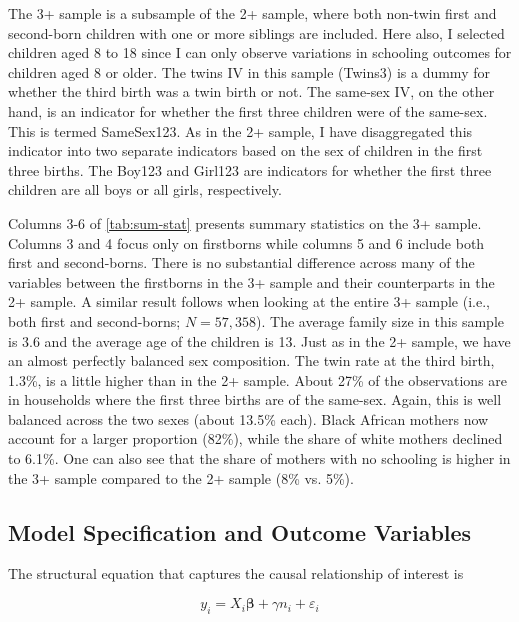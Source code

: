 The 3+ sample is a subsample of the 2+ sample, where both non-twin first and second-born children with one or more siblings are included. Here also, I selected children aged 8 to 18 since I can only observe variations in schooling outcomes for children aged 8 or older. The twins IV in this sample (Twins3) is a dummy for whether the third birth was a twin birth or not. The same-sex IV, on the other hand, is an indicator for whether the first three children were of the same-sex. This is termed SameSex123. As in the 2+ sample, I have disaggregated this indicator into two separate indicators based on the sex of children in the first three births. The Boy123 and Girl123 are indicators for whether the first three children are all boys or all girls, respectively. 

Columns 3-6 of \autoref{tab:sum-stat} presents summary statistics on the 3+ sample. Columns 3 and 4 focus only on firstborns while columns 5 and 6 include both first and second-borns. There is no substantial difference across many of the variables between the firstborns in the 3+ sample and their counterparts in the 2+ sample. A similar result follows when looking at the entire 3+ sample (i.e., both first and second-borns; $ N = 57,358 $). The average family size in this sample is 3.6 and the average age of the children is 13. Just as in the 2+ sample, we have an almost perfectly balanced sex composition. The twin rate at the third birth, 1.3\%, is a little higher than in the 2+ sample. About 27\% of the observations are in households where the first three births are of the same-sex. Again, this is well balanced across the two sexes (about 13.5\% each). Black African mothers now account for a larger proportion (82\%), while the share of white mothers declined to 6.1\%. One can also see that the share of mothers with no schooling is higher in the 3+ sample compared to the 2+ sample (8\% vs. 5\%).   
    

\subsection{Model Specification and Outcome Variables}
\label{section:outcomes}

The structural equation that captures the causal relationship of interest is

\begin{equation}\label{eq:01}
	y_{i} = X_{i}\boldsymbol{\beta} + \gamma n_{i} + \varepsilon_{i}
\end{equation}

